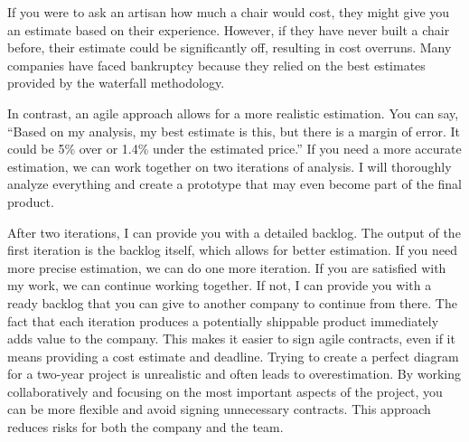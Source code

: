 If you were to ask an artisan how much a chair would cost, they might
give you an estimate based on their experience. However, if they have
never built a chair before, their estimate could be significantly off,
resulting in cost overruns. Many companies have faced bankruptcy because
they relied on the best estimates provided by the waterfall methodology.

In contrast, an agile approach allows for a more realistic estimation.
You can say, ``Based on my analysis, my best estimate is this, but there
is a margin of error. It could be 5\% over or 1.4\% under the estimated
price.'' If you need a more accurate estimation, we can work together on
two iterations of analysis. I will thoroughly analyze everything and
create a prototype that may even become part of the final product.

After two iterations, I can provide you with a detailed backlog. The
output of the first iteration is the backlog itself, which allows for
better estimation. If you need more precise estimation, we can do one
more iteration. If you are satisfied with my work, we can continue
working together. If not, I can provide you with a ready backlog that
you can give to another company to continue from there. The fact that
each iteration produces a potentially shippable product immediately adds
value to the company. This makes it easier to sign agile contracts, even
if it means providing a cost estimate and deadline. Trying to create a
perfect diagram for a two-year project is unrealistic and often leads to
overestimation. By working collaboratively and focusing on the most
important aspects of the project, you can be more flexible and avoid
signing unnecessary contracts. This approach reduces risks for both the
company and the team.

